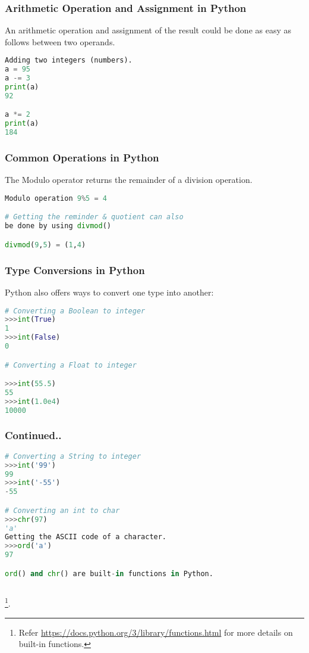 \documentclass{beamer}
\begin{document}
\begin{frame}[fragile]
\frametitle{Arithmetic Operation and Assignment in Python}
An arithmetic operation and assignment of the result could be done as easy as follows between two operands.

\begin{lstlisting}[language=Python]
Adding two integers (numbers).
a = 95
a -= 3
print(a)
92

a *= 2
print(a)
184
\end{lstlisting}
\end{frame}

\begin{frame}[fragile]
\frametitle{Common Operations in Python}
The Modulo operator returns the remainder of a division operation.
\begin{lstlisting}[language=Python]
Modulo operation 9%5 = 4

# Getting the reminder & quotient can also 
be done by using divmod()

divmod(9,5) = (1,4)

\end{lstlisting}
\end{frame}

\begin{frame}[fragile]
\frametitle{Type Conversions in Python}
Python also offers ways to convert one type into another:

\begin{lstlisting}[language=Python]
# Converting a Boolean to integer
>>>int(True)
1
>>>int(False)
0

# Converting a Float to integer

>>>int(55.5)
55
>>>int(1.0e4)
10000

\end{lstlisting}
\end{frame}
\begin{frame}[fragile]
\frametitle{Continued..}
\begin{lstlisting}[language=Python]
# Converting a String to integer
>>>int('99')
99
>>>int('-55')	
-55

# Converting an int to char
>>>chr(97)
'a'
Getting the ASCII code of a character.
>>>ord('a')
97

ord() and chr() are built-in functions in Python.
 
\end{lstlisting}
\footnote{\tiny{Refer \url{https://docs.python.org/3/library/functions.html} for more details on built-in functions.}}.
\end{frame}
\end{document}
